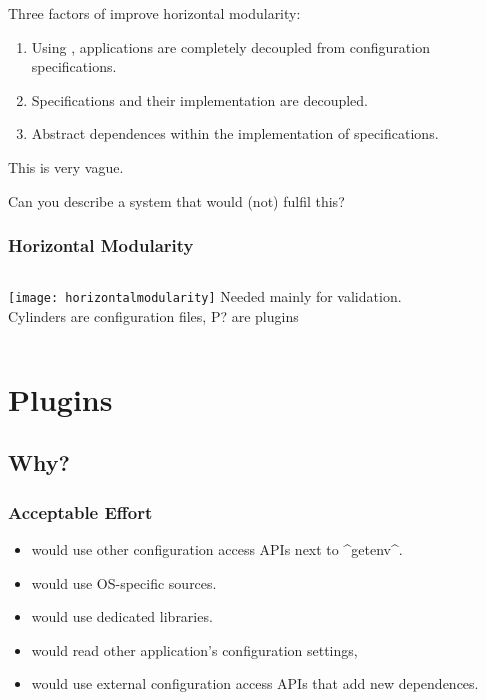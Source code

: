 \begin{frame}
	\label{slide:horizontal-modularity}
	Three factors of  improve horizontal modularity:
	\begin{enumerate}
	\item
	Using , applications are completely decoupled from configuration specifications.

	\item
	Specifications and their implementation are decoupled.

	\item
	Abstract dependences within the implementation of specifications.
	\end{enumerate}

	\begin{task}
	This is very vague.

	Can you describe a system that would (not) fulfil this?
	\end{task}
\end{frame}

\begin{frame}
	\frametitle{Horizontal Modularity}
	\begin{columns}[c]
	\column{7cm}
	\texttt{[image: horizontalmodularity]}
	\column{4cm}
	Needed mainly for validation. \\[1cm]

	Cylinders are configuration files, P? are plugins~\cite{raab2016improving}
	\end{columns}
\end{frame}


\section{Plugins}

\subsection{Why?}

\begin{frame}[fragile]
	\frametitle{Acceptable Effort}

	\methodQuestion{} 

	\begin{itemize}
	\item {} would use other configuration access APIs next to ^getenv^.
	\item {} would use OS-specific sources.
	\item {} would use dedicated libraries.
	\item {} would read other application's configuration settings,
	\item {} would use external configuration access APIs that add new dependences.
	\end{itemize}
\end{frame}


